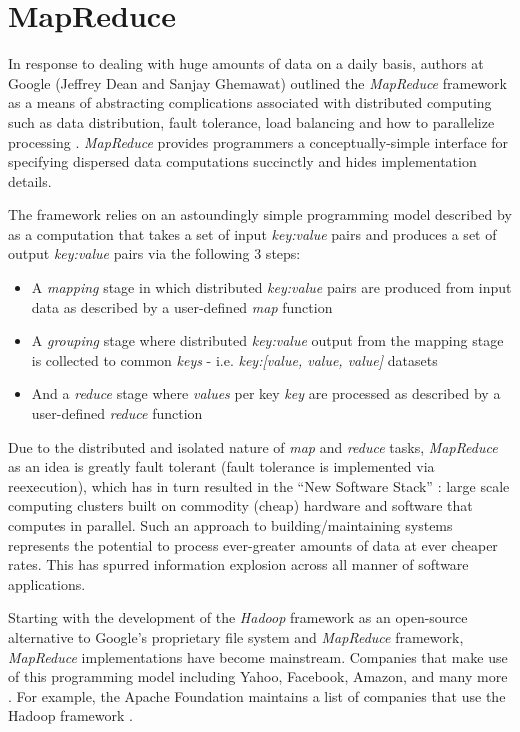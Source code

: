 \section{MapReduce}
In response to dealing with huge amounts of data on a daily basis, authors at Google (Jeffrey Dean and Sanjay Ghemawat) outlined the \textit{MapReduce} framework as a means of abstracting complications associated with distributed computing such as data distribution, fault tolerance, load balancing and how to parallelize processing \cite{Dean:2008}. \textit{MapReduce} provides programmers a conceptually-simple interface for specifying dispersed data computations succinctly and hides implementation details.

The framework relies on an astoundingly simple programming model described by \cite{Dean:2008} as a computation that takes a set of input \textit{key:value} pairs and produces a set of output \textit{key:value} pairs via the following 3 steps:

\begin{itemize}
    \item A \textit{mapping} stage in which distributed \textit{key:value} pairs are produced from input data as described by a user-defined \textit{map} function
    \item A \textit{grouping} stage where distributed \textit{key:value} output from the mapping stage is collected to common \textit{keys} - i.e. \textit{key:[value, value, value]} datasets
    \item And a \textit{reduce} stage where \textit{values} per key \textit{key} are processed as described by a user-defined \textit{reduce} function
\end{itemize}

Due to the distributed and isolated nature of \textit{map} and \textit{reduce} tasks, \textit{MapReduce} as an idea is greatly fault tolerant (fault tolerance is implemented via reexecution), which has in turn resulted in the ``New Software Stack'' \cite{mining2011}: large scale computing clusters built on commodity (cheap) hardware and software that computes in parallel. Such an approach to building/maintaining systems represents the potential to process ever-greater amounts of data at ever cheaper rates. This has spurred information explosion across all manner of software applications.

Starting with the development of the \textit{Hadoop} framework as an open-source alternative to Google's proprietary file system and \textit{MapReduce} framework, \textit{MapReduce} implementations have become mainstream. Companies that make use of this programming model including Yahoo, Facebook, Amazon, and many more \cite{chandar2010}. For example, the Apache Foundation maintains a list of companies that use the Hadoop framework \cite{hadoopPower:2017}.

